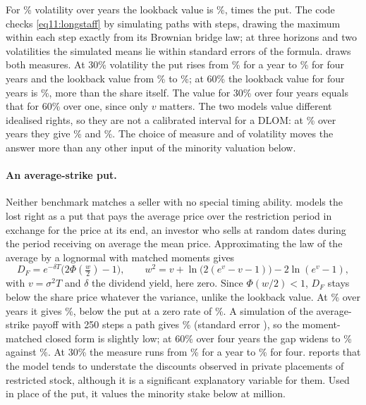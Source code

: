 \begin{chapterrefs}
For \dmSig\% volatility over \dmT{} years the lookback value is \dmLong\%, \dmLongOverPut{} times the put. The code checks
\cref{eq11:longstaff} by simulating \dmMcPaths{} paths with \dmMcSteps{} steps, drawing the maximum within
each step exactly from its Brownian bridge law; at three horizons and two volatilities the simulated
means lie within \dmMcMaxZ{} standard errors of the formula.  draws both measures. At
30\% volatility the put rises from \dmChThirtyOne\% for a year to \dmChThirtyFour\% for four years and the
lookback value from \dmLsThirtyOne\% to \dmLsThirtyFour\%; at 60\% the lookback value for four years is
\dmLsSixtyFour\%, more than the share itself. The value for 30\% over four years equals that for 60\% over
one, since only $v$ matters. The two models value different idealised rights, so they are not a
calibrated interval for a DLOM: at \dmSig\% over \dmT{} years they give \dmChaffe\% and \dmLong\%. The
choice of measure and of volatility moves the answer more than any other input of the minority valuation below.

\paragraph{An average-strike put.}
Neither benchmark matches a seller with no special timing ability. \textcite{finnerty2012} models the
lost right as a put that pays the average price over the restriction period in exchange for the
price at its end, an investor who sells at random dates during the period receiving on average the
mean price. Approximating the law of the average by a lognormal with matched moments gives
\begin{equation}\label{eq11:finnerty}
  D_F=e^{-\delta T}\bigl(2\Phi(\tfrac{w}{2})-1\bigr),\qquad
  w^2=v+\ln\bigl(2(e^{v}-v-1)\bigr)-2\ln(e^{v}-1),
\end{equation}
with $v=\sigma^2T$ and $\delta$ the dividend yield, here zero. Since $\Phi(w/2)<1$, $D_F$ stays below the
share price whatever the variance, unlike the lookback value. At \dmSig\% over \dmT{} years it gives
\dmFin\%, below the put at a zero rate of \dmChaffeZero\%. A simulation of the average-strike payoff
with 250 steps a path gives \dmFinMc\% (standard error \dmFinMcSE), so the moment-matched closed form
is slightly low; at 60\% over four years the gap widens to \dmFinSixtyFour\% against
\dmFinMcSixFour\%. At 30\% the measure runs from \dmFinThirtyOne\% for a year to \dmFinThirtyFour\% for
four. \textcite{finnerty2012} reports that the model tends to understate the discounts observed in
private placements of restricted stock, although it is a significant explanatory variable for them.
Used in place of the put, it values the minority stake below at \dmStakeFin{} million.


\end{chapterrefs}
